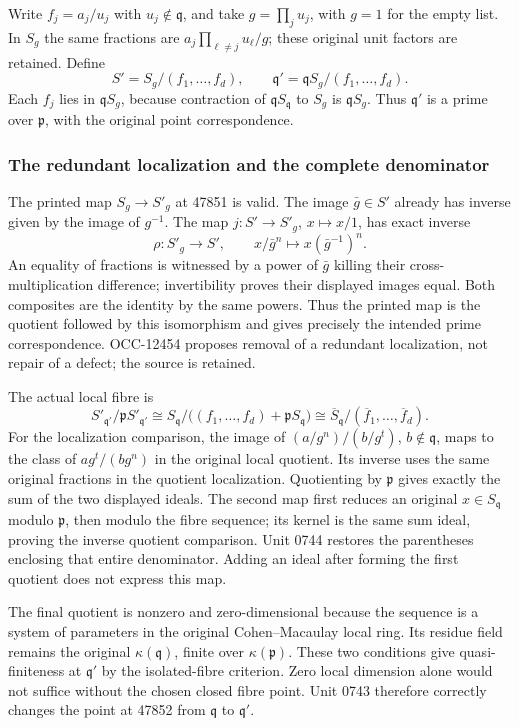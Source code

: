 Write \(f_j=a_j/u_j\) with \(u_j\notin\mathfrak q\), and take \(g=\prod_j u_j\), with \(g=1\) for the empty list. In \(S_g\) the same fractions are \(a_j\prod_{\ell\ne j}u_\ell/g\); these original unit factors are retained. Define \[
S'=S_g/(f_1,\ldots,f_d),\qquad
\mathfrak q'=\mathfrak qS_g/(f_1,\ldots,f_d).
\] Each \(f_j\) lies in \(\mathfrak qS_g\), because contraction of \(\mathfrak qS_{\mathfrak q}\) to \(S_g\) is \(\mathfrak qS_g\). Thus \(\mathfrak q'\) is a prime over \(\mathfrak p\), with the original point correspondence.

\subsubsection{The redundant localization and the complete denominator}\label{the-redundant-localization-and-the-complete-denominator}

The printed map \(S_g\to S'_g\) at 47851 is valid. The image \(\bar g\in S'\) already has inverse given by the image of \(g^{-1}\). The map \(j:S'\to S'_g\), \(x\mapsto x/1\), has exact inverse \[
\rho:S'_g\longrightarrow S',\qquad x/\bar g^n\longmapsto x(\bar g^{-1})^n.
\] An equality of fractions is witnessed by a power of \(\bar g\) killing their cross-multiplication difference; invertibility proves their displayed images equal. Both composites are the identity by the same powers. Thus the printed map is the quotient followed by this isomorphism and gives precisely the intended prime correspondence. OCC-12454 proposes removal of a redundant localization, not repair of a defect; the source is retained.

The actual local fibre is \[
S'_{\mathfrak q'}/\mathfrak pS'_{\mathfrak q'}
\cong S_{\mathfrak q}/\big((f_1,\ldots,f_d)+\mathfrak pS_{\mathfrak q}\big)
\cong\overline S_{\mathfrak q}/(\overline f_1,\ldots,\overline f_d).
\] For the localization comparison, the image of \((a/g^n)/(b/g^t)\), \(b\notin\mathfrak q\), maps to the class of \(ag^t/(bg^n)\) in the original local quotient. Its inverse uses the same original fractions in the quotient localization. Quotienting by \(\mathfrak p\) gives exactly the sum of the two displayed ideals. The second map first reduces an original \(x\in S_{\mathfrak q}\) modulo \(\mathfrak p\), then modulo the fibre sequence; its kernel is the same sum ideal, proving the inverse quotient comparison. Unit 0744 restores the parentheses enclosing that entire denominator. Adding an ideal after forming the first quotient does not express this map.

The final quotient is nonzero and zero-dimensional because the sequence is a system of parameters in the original Cohen--Macaulay local ring. Its residue field remains the original \(\kappa(\mathfrak q)\), finite over \(\kappa(\mathfrak p)\). These two conditions give quasi-finiteness at \(\mathfrak q'\) by the isolated-fibre criterion. Zero local dimension alone would not suffice without the chosen closed fibre point. Unit 0743 therefore correctly changes the point at 47852 from \(\mathfrak q\) to \(\mathfrak q'\).

